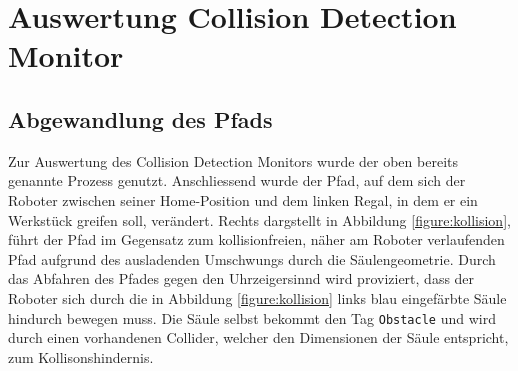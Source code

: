 \section{Auswertung Collision Detection Monitor}
\label{sec:collisionauswertung}

\subsection{Abgewandlung des Pfads} Zur Auswertung des Collision Detection
Monitors wurde der oben bereits genannte Prozess genutzt. Anschliessend wurde
der Pfad, auf dem sich der Roboter zwischen seiner Home-Position und dem linken
Regal, in dem er ein Werkstück greifen soll, verändert. Rechts dargstellt in
Abbildung \ref{figure:kollision}, führt der Pfad im Gegensatz zum
kollisionfreien, näher am Roboter verlaufenden Pfad aufgrund des ausladenden
Umschwungs durch die Säulengeometrie. Durch das Abfahren des Pfades gegen den
Uhrzeigersinnd wird proviziert, dass der Roboter sich durch die in Abbildung
\ref{figure:kollision} links blau eingefärbte Säule hindurch bewegen muss. Die Säule selbst
bekommt den Tag \texttt{Obstacle} und wird durch einen vorhandenen Collider,
welcher den Dimensionen der Säule entspricht, zum Kollisonshindernis.

